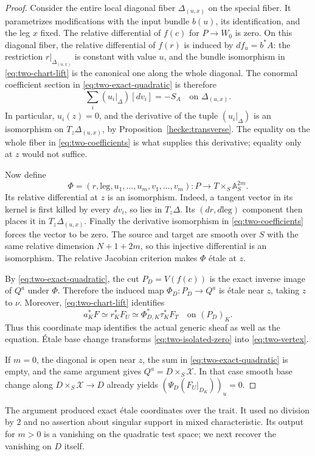 \begin{proof}
Consider the entire local diagonal fiber
$\Delta_{(u,x)}$ on the special fiber.
It parametrizes modifications with the input bundle
$b(u)$, its identification, and the leg $x$ fixed.
The relative differential of $f(c)$ for $P\to W_0$ is zero.
On this diagonal fiber, the relative differential of $f(r)$
is induced by $df_u=b^*A$: the restriction $r|_{\Delta_{(u,x)}}$
is constant with value $u$, and the bundle isomorphism in
\eqref{eq:two-chart-lift} is the canonical one along the whole
diagonal.
The conormal coefficient section in
\eqref{eq:two-exact-quadratic} is therefore
\begin{equation}
 \label{eq:two-coefficients}
 \sum_i(u_i|_\Delta)[dv_i]=-S_A
       \quad\text{on }\Delta_{(u,x)}.
\end{equation}
In particular, $u_i(z)=0$, and the derivative of the tuple
$(u_i|_\Delta)$ is an isomorphism on
$T_z\Delta_{(u,x)}$, by Proposition~\ref{hecke:transverse}.
The equality on the whole fiber in
\eqref{eq:two-coefficients} is what supplies this derivative;
equality only at $z$ would not suffice.

Now define
\[
 \Phi=(r,\text{leg},u_1,\ldots,u_m,v_1,\ldots,v_m):
 P\longrightarrow T\times_S\mathbb A_S^{2m}.
\]
Its relative differential at $z$ is an isomorphism.
Indeed, a tangent vector in its kernel is first killed by every
$dv_i$, so lies in $T_z\Delta$. Its $(dr,d\text{leg})$ component
then places it in $T_z\Delta_{(u,x)}$. Finally the derivative
isomorphism in \eqref{eq:two-coefficients} forces the vector
to be zero. The source and target are smooth over $S$ with
the same relative dimension $N+1+2m$, so this injective
differential is an isomorphism. The relative Jacobian
criterion makes $\Phi$ étale at $z$.

By \eqref{eq:two-exact-quadratic}, the cut $P_D=V(f(c))$ is
the exact inverse image of $Q^a$ under $\Phi$. Therefore the
induced map $\Phi_D:P_D\to Q^a$ is étale near $z$, taking $z$ to $\nu$.
Moreover, \eqref{eq:two-chart-lift} identifies
\[
 a_K^*F\simeq r_K^*F_U
       \simeq \Phi_{D,K}^*\tau_K^*F_T
       \quad\text{on }(P_D)_K.
\]
Thus this coordinate map identifies the actual generic sheaf
as well as the equation. Étale base change transforms
\eqref{eq:two-isolated-zero} into \eqref{eq:two-vertex}.

If $m=0$, the diagonal is open near $z$, the sum in
\eqref{eq:two-exact-quadratic} is empty, and the same argument
gives $Q^a=D\times_S\mathscr X$. In that case smooth base
change along $D\times_S\mathscr X\to D$ already yields
$(\Psi_D(F_U|_{D_K}))_u=0$.
\end{proof}

The argument produced exact étale coordinates over the trait.
It used no division by $2$ and no assertion about singular
support in mixed characteristic. Its output for $m>0$ is a
vanishing on the quadratic test space; we next recover the
vanishing on $D$ itself.
